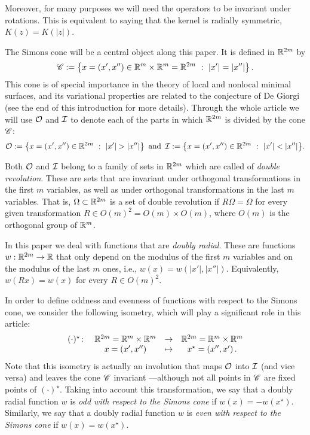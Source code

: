 Moreover, for many  purposes we will need the operators to be invariant under rotations. This is equivalent to saying that the kernel is radially symmetric, $K(z) = K(|z|)$. 




The Simons cone will be a central object along this paper. It is defined in $\mathbb{R}^{2m}$ by
\begin{equation}
\label{Eq:SimonsCone}
\mathscr{C} := \left \{ x = (x', x'') \in \mathbb{R}^m \times \mathbb{R}^m=\mathbb{R}^{2m} \ : \ |x'| = |x''| \right \}.
\end{equation}
This cone is of special importance in the theory of local and nonlocal minimal surfaces, and its variational properties are related to the conjecture of De Giorgi (see the end of this introduction for more details). Through the whole article we will use $\mathcal{O}$ and $\mathcal{I}$ to denote each of the parts in which $\mathbb{R}^{2m}$ is divided by the cone $\mathscr{C}$:
$$
\mathcal{O}:= \left \{ x = (x', x'') \in \mathbb{R}^{2m} \ : \ |x'| > |x''| \right \} \textrm{ and } \,
\mathcal{I}:= \left \{ x = (x', x'') \in \mathbb{R}^{2m} \ : \ |x'| < |x''| \right \}\!.
$$

Both $\mathcal{O}$ and $\mathcal{I}$ belong to a family of sets in $\mathbb{R}^{2m}$ which are called of \emph{double revolution}. These are sets that are invariant under orthogonal transformations in the first $m$ variables, as well as under orthogonal transformations in the last $m$ variables. That is, $\Omega\subset \mathbb{R}^{2m}$ is a set of double revolution if $R\Omega = \Omega$ for every given transformation $R\in O(m)^2 = O(m) \times O(m)$, where  $O(m)$ is the orthogonal group of $\mathbb{R}^m$.

In this paper we deal with functions that are \emph{doubly radial}. These are functions $w:\mathbb{R}^{2m}  \to \mathbb{R}$ that only depend on the modulus of the first $m$ variables and on the modulus of the last $m$ ones, i.e., $w(x) = w(|x'|,|x''|)$. Equivalently, $w(Rx) = w(x)$ for every $R \in O(m)^2$.

In order to define oddness and evenness of functions with respect to the Simons cone, we consider the following isometry, which will play a significant role in this article:
\begin{equation}
\label{Eq:DefStar}
\begin{matrix}
(\cdot)^\star \colon & \mathbb{R}^{2m}= \mathbb{R}^{m}\times \mathbb{R}^{m}  &\to&  \mathbb{R}^{2m}= \mathbb{R}^{m}\times \mathbb{R}^{m}  \\
& x = (x',x'') &\mapsto & x^\star = (x'',x')\,.
\end{matrix}
\end{equation}
Note that this isometry is actually an involution that maps $\mathcal{O}$ into $\mathcal{I}$ (and vice versa) and leaves the cone $\mathscr{C}$ invariant ---although not all points in $\mathscr{C}$ are fixed points of $(\cdot)^\star$. Taking into account this transformation, we say that a doubly radial function $w$ is \emph{odd with respect to the Simons cone} if $w(x) = -w(x^\star)$. Similarly, we say that a doubly radial function $w$ is \emph{even with respect to the Simons cone} if $w(x) = w(x^\star)$.


